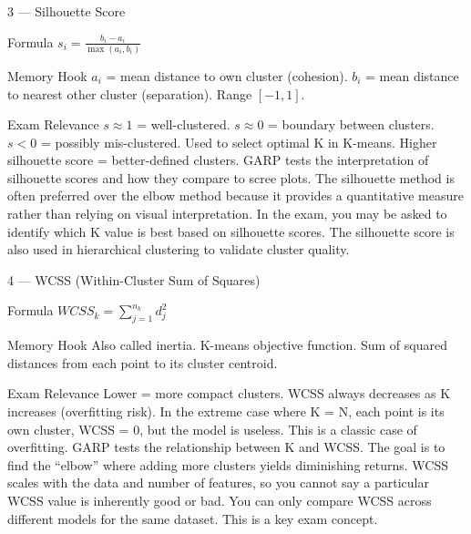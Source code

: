 \documentclass[aspectratio=169,8pt]{beamer}
\begin{document}
	\begin{frame}{3 --- Silhouette Score}
		\begin{block}{Formula}
			$s_i = \frac{b_i - a_i}{\max(a_i, b_i)}$
		\end{block}
		\begin{block}{Memory Hook}
			$a_i$ = mean distance to own cluster (cohesion). $b_i$ = mean distance to nearest other cluster (separation). Range $[-1,1]$.
		\end{block}
		\begin{block}{Exam Relevance}
			$s \approx 1$ = well-clustered. $s \approx 0$ = boundary between clusters. $s < 0$ = possibly mis-clustered. Used to select optimal K in K-means. Higher silhouette score = better-defined clusters. GARP tests the interpretation of silhouette scores and how they compare to scree plots. The silhouette method is often preferred over the elbow method because it provides a quantitative measure rather than relying on visual interpretation. In the exam, you may be asked to identify which K value is best based on silhouette scores. The silhouette score is also used in hierarchical clustering to validate cluster quality.
		\end{block}
	\end{frame}
	
	\begin{frame}{4 --- WCSS (Within-Cluster Sum of Squares)}
		\begin{block}{Formula}
			$WCSS_k = \sum_{j=1}^{n_k} d_j^2$
		\end{block}
		\begin{block}{Memory Hook}
			Also called inertia. K-means objective function. Sum of squared distances from each point to its cluster centroid.
		\end{block}
		\begin{block}{Exam Relevance}
			Lower = more compact clusters. WCSS always decreases as K increases (overfitting risk). In the extreme case where K = N, each point is its own cluster, WCSS = 0, but the model is useless. This is a classic case of overfitting. GARP tests the relationship between K and WCSS. The goal is to find the ``elbow'' where adding more clusters yields diminishing returns. WCSS scales with the data and number of features, so you cannot say a particular WCSS value is inherently good or bad. You can only compare WCSS across different models for the same dataset. This is a key exam concept.
		\end{block}
	\end{frame}
	
\end{document}
